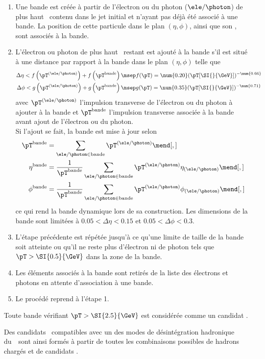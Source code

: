 \begin{enumerate}
\item Une bande est créée à partir de l'électron ou du photon ($\ele/\photon$) de plus haut \pT\ contenu dans le jet initial et n'ayant pas déjà été associé à une bande. La position de cette particule dans le plan $(\eta,\phi)$, ainsi que son \pT, sont associés à la bande.
\item L'électron ou photon de plus haut \pT\ restant est ajouté à la bande s'il est situé à une distance par rapport à la bande dans le plan $(\eta,\phi)$ telle que
\begin{align}
\Delta\eta < f\left(\pT^{(\ele/\photon)}\right) + f\left(\pT^\text{bande}\right) \msep& f(\pT) = \num{0.20} (\pT [\SI{}{\GeV}])^{-\num{0.66}}\\
\Delta\phi < g\left(\pT^{(\ele/\photon)}\right) + g\left(\pT^\text{bande}\right) \msep& g(\pT) = \num{0.35} (\pT [\SI{}{\GeV}])^{-\num{0.71}}
\end{align}
avec $\pT^{(\ele/\photon)}$ l'impulsion transverse de l'électron ou du photon à ajouter à la bande et $\pT^\text{bande}$ l'impulsion transverse associée à la bande avant ajout de l'électron ou du photon.\\
Si l'ajout se fait, la bande est mise à jour selon
\begin{align}
\pT^\text{bande} &= \sum_{\ele/\photon\in\text{bande}}\pT^{(\ele/\photon)}\mend[,]\\
\eta^\text{bande} &= \frac{1}{\pT^\text{bande}} \sum_{\ele/\photon\in\text{bande}}\pT^{(\ele/\photon)} \eta_{(\ele/\photon)}\mend[,]\\
\phi^\text{bande} &= \frac{1}{\pT^\text{bande}} \sum_{\ele/\photon\in\text{bande}}\pT^{(\ele/\photon)} \phi_{(\ele/\photon)}\mend[,]
\end{align}
ce qui rend la bande dynamique lors de sa construction.
Les dimensions de la bande sont limitées à $\num{0.05}<\Delta\eta<\num{0.15}$ et $\num{0.05}<\Delta\phi<\num{0.3}$.
\item L'étape précédente est répétée jusqu'à ce qu'une limite de taille de la bande soit atteinte ou qu'il ne reste plus d'électron ni de photon tels que $\pT>\SI{0.5}{\GeV}$ dans la zone de la bande.
\item Les éléments associés à la bande sont retirés de la liste des électrons et photons en attente d'association à une bande.
\item Le procédé reprend à l'étape 1.
\end{enumerate}
Toute bande vérifiant $\pT>\SI{2.5}{\GeV}$ est considérée comme un candidat \pionnull.
\par
Des candidats \tauh\ compatibles avec un des modes de désintégration hadronique du~\tau\ sont ainsi formés à partir de toutes les combinaisons possibles de hadrons chargés et de candidats \pionnull.
